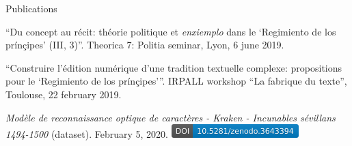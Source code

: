 











\begin{rubric}{Publications}
                    
                
                    
                    \entry*
                
                    
                    \entry*
                
                    
                    \entry*
                \enquote{Du concept au récit: théorie politique et
                        \textit{enxiemplo} dans le \enquote{Regimiento de los
                        prínçipes} (III, 3)}. Theorica 7: Politia
                        seminar, Lyon, 6 june 2019.
                    
                    \entry*
                \enquote{Construire l'édition numérique d'une
                        tradition textuelle complexe: propositions pour le
                        \enquote{Regimiento de los prínçipes}}.
                        IRPALL workshop \enquote{La fabrique du texte},
                        Toulouse, 22 february 2019.
            
                    
                    \entry*
                
                    
                    \entry*
                \textit{Modèle de reconnaissance optique de
                        caractères - Kraken - Incunables sévillans
                        1494-1500} (dataset). February 5, 2020. \href{https://zenodo.org/record/3643393}{\includegraphics[scale=0.55]{img/kraken_doi.png}}\end{rubric}


